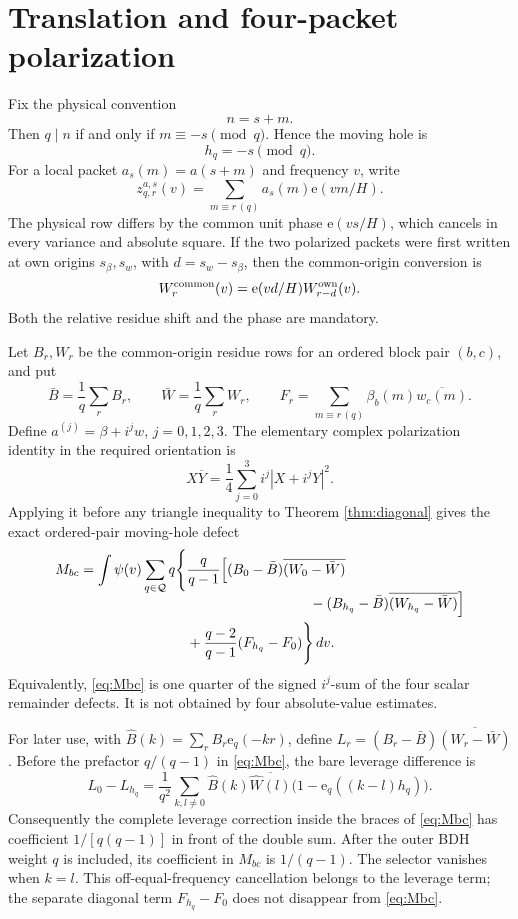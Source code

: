 \documentclass[11pt]{article}
\newcommand{\e}{\mathrm e}
\newcommand{\cQ}{\mathcal Q}
\begin{document}
\section{Translation and four-packet polarization}

Fix the physical convention
\begin{equation}\label{eq:translation}
 n=s+m.
\end{equation}
Then $q\mid n$ if and only if $m\equiv-s\pmod q$.  Hence the moving hole is
\begin{equation}\label{eq:moving-hole-sign}
 \boxed{h_q=-s\pmod q.}
\end{equation}
For a local packet $a_s(m)=a(s+m)$ and frequency $v$, write
\[
 z^{a,s}_{q,r}(v)=\sum_{m\equiv r\,(q)}a_s(m)\e(vm/H).
\]
The physical row differs by the common unit phase $\e(vs/H)$, which cancels
in every variance and absolute square.  If the two polarized packets were
first written at own origins $s_\beta,s_w$, with $d=s_w-s_\beta$, then the
common-origin conversion is
\begin{equation}\label{eq:common-origin}
 W_r^{\rm common}(v)=\e(vd/H)W_{r-d}^{\rm own}(v).
\end{equation}
Both the relative residue shift and the phase are mandatory.

Let $B_r,W_r$ be the common-origin residue rows for an ordered block pair
$(b,c)$, and put
\[
 \bar B=\frac1q\sum_rB_r,\qquad
 \bar W=\frac1q\sum_rW_r,\qquad
 F_r=\sum_{m\equiv r\,(q)}\beta_b(m)\overline{w_c(m)}.
\]
Define $a^{(j)}=\beta+i^jw$, $j=0,1,2,3$.  The elementary complex
polarization identity in the required orientation is
\[
 X\overline Y=\frac14\sum_{j=0}^3i^j|X+i^jY|^2.
\]
Applying it before any triangle inequality to Theorem \ref{thm:diagonal}
gives the exact ordered-pair moving-hole defect
\begin{align}
 M_{bc}=\int\psi(v)\sum_{q\in\cQ}q\Bigg\{&
 \frac q{q-1}\Big[(B_0-\bar B)\overline{(W_0-\bar W)}
 \notag\\[-2mm]
 &\hspace{31mm}-(B_{h_q}-\bar B)
 \overline{(W_{h_q}-\bar W)}\Big]
 \notag\\
 &+\frac{q-2}{q-1}(F_{h_q}-F_0)\Bigg\}\,dv.
 \label{eq:Mbc}
\end{align}
Equivalently, \eqref{eq:Mbc} is one quarter of the signed $i^j$-sum of the
four scalar remainder defects.  It is not obtained by four absolute-value
estimates.

For later use, with
$\widehat B(k)=\sum_rB_r\e_q(-kr)$, define
$L_r=(B_r-\bar B)\overline{(W_r-\bar W)}$.  Before the prefactor
$q/(q-1)$ in \eqref{eq:Mbc}, the bare leverage difference is
\begin{equation}\label{eq:dft-selector}
 L_0-L_{h_q}=\frac1{q^2}\sum_{k,l\ne0}\widehat B(k)
 \overline{\widehat W(l)}\bigl(1-\e_q((k-l)h_q)\bigr).
\end{equation}
Consequently the complete leverage correction inside the braces of
\eqref{eq:Mbc} has coefficient $1/[q(q-1)]$ in front of the double sum.
After the outer BDH weight $q$ is included, its coefficient in $M_{bc}$ is
$1/(q-1)$.  The selector vanishes when $k=l$.  This off-equal-frequency
cancellation belongs to the leverage term; the separate diagonal term
$F_{h_q}-F_0$ does not disappear from \eqref{eq:Mbc}.
\end{document}

